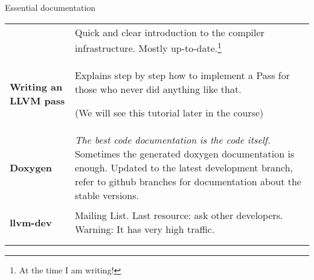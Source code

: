 \begin{frame}[t]{Essential documentation}
\vfill
	\begin{tabular}{>{\RaggedLeft\arraybackslash}p{}>{\RaggedRight\arraybackslash}p{}}
	{\textbf{Intro to LLVM}\par\cite{LOCAL:www/llvmIntro}}
		& Quick and clear introduction to the compiler infrastructure.
       Mostly up-to-date.\footnote{At the time I am writing!} \\ \addlinespace[0.6em]
  \textbf{Writing an LLVM pass}\par\cite{LOCAL:www/llvmWritingAPass}
		& Explains step by step how to implement a Pass
       for those who never did anything like that.\par
       (We will see this tutorial later in the course) \\ \addlinespace[0.6em]
  \textbf{Doxygen}\par\cite{LOCAL:www/llvmDoxygen}
		& \textit{The best code documentation is the code itself.}
       Sometimes the generated doxygen documentation is enough.
       Updated to the latest development branch, refer to github branches 
       for documentation about the stable versions. \\ \addlinespace[0.6em]
  \textbf{llvm-dev}\par\cite{LOCAL:www/llvmDoxygen}
  	& Mailing List. Last resource: ask other developers.
       Warning: It has very high traffic.\\ \addlinespace[0.6em]
	\end{tabular}
	\vfill
\end{frame}

